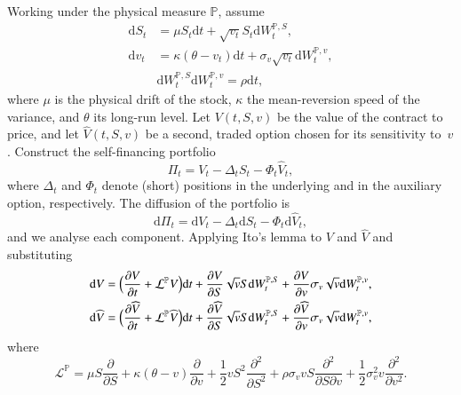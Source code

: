 \documentclass[12pt]{report} %
\theoremstyle{plain}           %
\theoremstyle{definition}      %
\theoremstyle{remark}          %
\begin{document}
Working under the physical measure $\mathbb P$, assume
\begin{equation}\label{eq:heston_phys}
\begin{aligned}
\mathrm dS_t &= \mu S_t \mathrm dt + \sqrt{v_t}S_t\mathrm dW_t^{\mathbb P,S},\\
\mathrm dv_t &= \kappa(\theta - v_t)\mathrm dt + \sigma_v\sqrt{v_t}\mathrm dW_t^{\mathbb P,v},\\
&\mathrm dW_t^{\mathbb P,S}\mathrm dW_t^{\mathbb P,v} = \rho\mathrm dt,
\end{aligned}
\end{equation}
where $\mu$ is the physical drift of the stock, $\kappa$ the mean-reversion speed of the
variance, and $\theta$ its long-run level. Let $V(t,S,v)$ be the value of the contract to price,
and let $\widehat V(t,S,v)$ be a second, traded option chosen for its sensitivity to~$v$.
Construct the self-financing portfolio
\begin{equation}\label{eq:heston_portfolio}
\Pi_t = V_t - \Delta_t S_t - \Phi_t \widehat V_t ,
\end{equation}
where $\Delta_t$ and $\Phi_t$ denote (short) positions in the underlying and in the auxiliary
option, respectively.  The diffusion of the portfolio is
\begin{equation}\label{eq:heston_portfolio_diffusion}
\mathrm d\Pi_t = \mathrm dV_t - \Delta_t \mathrm dS_t - \Phi_t \mathrm d\widehat V_t,
\end{equation}
and we analyse each component. Applying Ito's lemma to $V$ and $\widehat V$ and substituting
\begin{equation}\label{eq:heston_dVs}
\begin{aligned}
\mathrm dV &= \Bigl(\frac{\partial V}{\partial t} + \mathcal L^{\mathbb P}V\Bigr)\mathrm dt
           + \frac{\partial V}{\partial S}\sqrt{v}S\mathrm dW_t^{\mathbb P,S}
           + \frac{\partial V}{\partial v}\sigma_v\sqrt{v}\mathrm dW_t^{\mathbb P,v},\\
\mathrm d\widehat V &= \Bigl(\frac{\partial \widehat V}{\partial t} + \mathcal L^{\mathbb P}\widehat V\Bigr)\mathrm dt
           + \frac{\partial \widehat V}{\partial S}\sqrt{v}S\mathrm dW_t^{\mathbb P,S}
           + \frac{\partial \widehat V}{\partial v}\sigma_v\sqrt{v}\mathrm dW_t^{\mathbb P,v},
\end{aligned}
\end{equation}
where
\[
\mathcal L^{\mathbb P}
  = \mu S\frac{\partial}{\partial S}
    + \kappa(\theta - v)\frac{\partial}{\partial v}
    + \frac{1}{2} v S^{2}\frac{\partial^{2}}{\partial S^{2}}
    + \rho\sigma_v v S\frac{\partial^{2}}{\partial S\partial v}
    + \frac{1}{2}\sigma_v^{2} v \frac{\partial^{2}}{\partial v^{2}}.
\]
\end{document}
